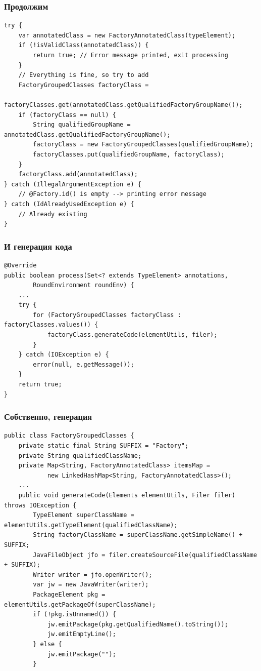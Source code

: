 \documentclass[xetex,mathserif,serif]{beamer}
\begin{document}
	\begin{frame}[fragile]
		\frametitle{Продолжим}
		\begin{footnotesize}
			\begin{verbatim}
try {
    var annotatedClass = new FactoryAnnotatedClass(typeElement);
    if (!isValidClass(annotatedClass)) {
        return true; // Error message printed, exit processing
    }
    // Everything is fine, so try to add
    FactoryGroupedClasses factoryClass =
            factoryClasses.get(annotatedClass.getQualifiedFactoryGroupName());
    if (factoryClass == null) {
        String qualifiedGroupName = annotatedClass.getQualifiedFactoryGroupName();
        factoryClass = new FactoryGroupedClasses(qualifiedGroupName);
        factoryClasses.put(qualifiedGroupName, factoryClass);
    }
    factoryClass.add(annotatedClass);
} catch (IllegalArgumentException e) {
    // @Factory.id() is empty --> printing error message
} catch (IdAlreadyUsedException e) {
    // Already existing
}
			\end{verbatim}
		\end{footnotesize}
	\end{frame}

	\begin{frame}[fragile]
		\frametitle{И генерация кода}
		\begin{footnotesize}
			\begin{verbatim}
@Override
public boolean process(Set<? extends TypeElement> annotations, 
        RoundEnvironment roundEnv) {
    ...
    try {
        for (FactoryGroupedClasses factoryClass : factoryClasses.values()) {
            factoryClass.generateCode(elementUtils, filer);
        }
    } catch (IOException e) {
        error(null, e.getMessage());
    }
    return true;
}
			\end{verbatim}
		\end{footnotesize}
	\end{frame}

	\begin{frame}[fragile]
		\frametitle{Собственно, генерация}
		\begin{footnotesize}
			\begin{verbatim}
public class FactoryGroupedClasses {
    private static final String SUFFIX = "Factory";
    private String qualifiedClassName;
    private Map<String, FactoryAnnotatedClass> itemsMap =
            new LinkedHashMap<String, FactoryAnnotatedClass>();
    ...
    public void generateCode(Elements elementUtils, Filer filer) throws IOException {
        TypeElement superClassName = elementUtils.getTypeElement(qualifiedClassName);
        String factoryClassName = superClassName.getSimpleName() + SUFFIX;
        JavaFileObject jfo = filer.createSourceFile(qualifiedClassName + SUFFIX);
        Writer writer = jfo.openWriter();
        var jw = new JavaWriter(writer);
        PackageElement pkg = elementUtils.getPackageOf(superClassName);
        if (!pkg.isUnnamed()) {
            jw.emitPackage(pkg.getQualifiedName().toString());
            jw.emitEmptyLine();
        } else {
            jw.emitPackage("");
        }
			\end{verbatim}
		\end{footnotesize}
	\end{frame}
\end{document}
